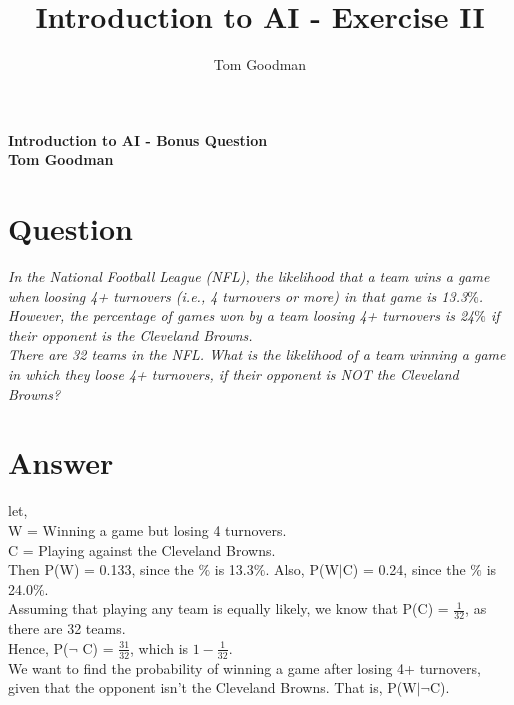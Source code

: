 \documentclass{article}
\title{Introduction to AI - Exercise II}
\author{Tom Goodman}
\date{}
\newcommand\ddfrac[2]{\frac{\displaystyle #1}{\displaystyle #2}}
\begin{document}
\begin{titlepage}
	\begin{flushleft}
		\vspace*{1cm}
		\Huge
		\textbf{Introduction to AI - Bonus Question} \\
		\vspace*{1cm}
		\Large
		\textbf{Tom Goodman} \\
	\end{flushleft}
\end{titlepage}
\newpage
\section{Question}
\textit{In the National Football League (NFL), the likelihood that a team wins a game
when loosing 4+ turnovers (i.e., 4 turnovers or more) in that game is 13.3$\%$.
However, the percentage of games won by a team loosing 4+ turnovers is 24$\%$ if
their opponent is the Cleveland Browns.}\\

\textit{There are 32 teams in the NFL. What is the likelihood of a team winning a game
in which they loose 4+ turnovers, if their opponent is NOT the Cleveland Browns?}\\
\section{Answer}
let, \\
\-\hspace{10mm} W = Winning a game but losing 4 turnovers. \\
\-\hspace{10mm} C = Playing against the Cleveland Browns. \\

Then P(W) = 0.133, since the $\%$ is 13.3$\%$. Also, P(W$|$C) = 0.24, since the $\%$ is 24.0$\%$. \\

Assuming that playing any team is equally likely, we know that P(C) = $\ddfrac{1}{32}$, as there are 32 teams. \\

Hence, P($\lnot$ C) = $\ddfrac{31}{32}$, which is $1 - \ddfrac{1}{32}$. \\

We want to find the probability of winning a game after losing 4+ turnovers, given that the opponent isn't the Cleveland Browns. That is, P(W$|\lnot$C).\\
\end{document}
